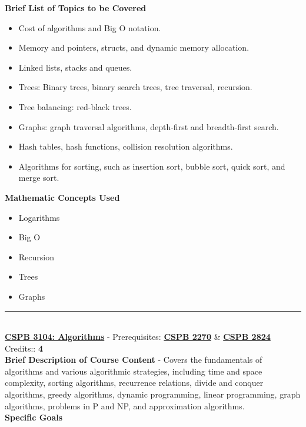 \documentclass{article}
\newcommand{\horizontalline}{\noindent \rule{\textwidth}{0.5pt} \\}
\begin{document}
\noindent \textbf{Brief List of Topics to be Covered}
\begin{itemize}
    \item Cost of algorithms and Big O notation.
    \item Memory and pointers, structs, and dynamic memory allocation.
    \item Linked lists, stacks and queues.
    \item Trees: Binary trees, binary search trees, tree traversal, recursion.
    \item Tree balancing: red-black trees.
    \item Graphs: graph traversal algorithms, depth-first and breadth-first search.
    \item Hash tables, hash functions, collision resolution algorithms.
    \item Algorithms for sorting, such as insertion sort, bubble sort, quick sort, and merge sort.
\end{itemize}

\noindent \textbf{Mathematic Concepts Used}
\begin{itemize}
    \item Logarithms
    \item Big O
    \item Recursion
    \item Trees
    \item Graphs
\end{itemize}
\horizontalline
\noindent \href{https://www.colorado.edu/program/cspb/cspb-3104-algorithms}{\textbf{CSPB 3104: Algorithms}} - Prerequisites: \href{https://www.colorado.edu/program/cspb/cspb-2270-computer-science-2-data-structures}{\textbf{CSPB 2270}} \& \href{https://www.colorado.edu/program/cspb/cspb-2824-discrete-structures}{\textbf{CSPB 2824}} Credits:: \textbf{4} \\

\noindent \textbf{Brief Description of Course Content} - Covers the fundamentals of algorithms and various algorithmic strategies, including time and space complexity, sorting algorithms, recurrence relations, divide and conquer algorithms, greedy algorithms, dynamic programming, linear programming, graph algorithms, problems in P and NP, and approximation algorithms. \\

\noindent \textbf{Specific Goals} \\ 
\end{document}
